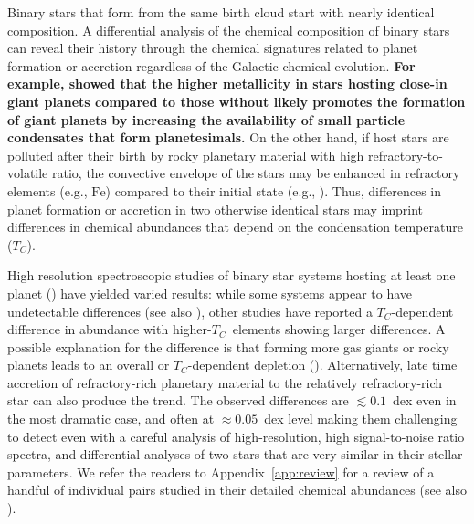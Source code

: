 \documentclass[modern, letterpaper]{aastex61}
\newcommand*\elem[1]{\ensuremath{\mathrm{#1}}}
\newcommand{\Tcondens}{\ensuremath{T_C}}
\newcommand*{\askjmb}[1]{{\bf #1}}
\begin{document}
Binary stars that form from the same birth cloud start with nearly identical
composition.
A differential analysis of the chemical composition of binary stars can reveal
their history through the chemical signatures related to planet formation or
accretion regardless of the Galactic chemical evolution.
\askjmb{
For example, \citealt{Fischer:2005aa} showed that the higher metallicity in
stars hosting close-in giant planets compared to those without likely promotes
the formation of giant planets by increasing the availability of small particle
condensates that form planetesimals.
}
On the other hand, if host stars are polluted after their birth by rocky
planetary material with high refractory-to-volatile ratio, the convective
envelope of the stars may be enhanced in refractory elements (e.g., \elem{Fe})
compared to their initial state (e.g., \citealt{Pinsonneault:2001aa}).
Thus, differences in planet formation or accretion in two otherwise identical
stars may imprint differences in chemical abundances that depend on the
condensation temperature (\Tcondens).

High resolution spectroscopic studies of binary star systems hosting at least
one planet (\citealt{2011ApJ...740...76R,2014ApJ...790L..25T,Teske:2013aa,
  Mack:2014aa,Liu:2014aa,Teske:2015aa,Saffe:2015aa,
  Ramirez:2015aa,Biazzo:2015aa,Mack:2016aa,Teske:2016aa,Teske:2016ab})
have yielded varied results:
while some systems appear to have undetectable differences
(see also \citealt{Desidera:2004aa,Gratton:2001aa}), other
studies have reported a \Tcondens-dependent difference in abundance
with higher-\Tcondens\ elements showing larger differences.
A possible explanation for the difference is that
forming more gas giants or rocky planets leads to
an overall or \Tcondens-dependent depletion
(\citealt{Ramirez:2015aa,Biazzo:2015aa}).
Alternatively, late time accretion of refractory-rich planetary material to the
relatively refractory-rich star can also produce the trend.
The observed differences are $\lesssim 0.1$~dex even in the most dramatic case,
and often at $\approx 0.05$~dex level making them challenging to detect even
with a careful analysis of high-resolution, high signal-to-noise ratio spectra,
and differential analyses of two stars that are very similar in their
stellar parameters.
We refer the readers to Appendix~\ref{app:review} for a review of
a handful of individual pairs studied in their detailed chemical abundances
(see also \citealt{2016arXiv161104064M}).
\end{document}

